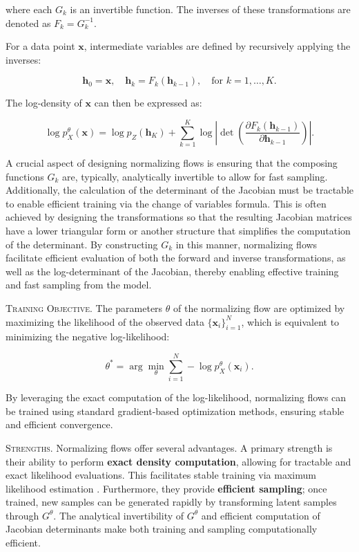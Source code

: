 \noindent where each $G_k$ is an invertible function. The inverses of these transformations are denoted as $F_k = G_k^{-1}$.

\noindent For a data point $\mathbf{x}$, intermediate variables are defined by recursively applying the inverses:

\[
\mathbf{h}_0 = \mathbf{x}, \quad \mathbf{h}_k = F_k(\mathbf{h}_{k-1}), \quad \text{for } k = 1, \dots, K.
\]

\noindent The log-density of $\mathbf{x}$ can then be expressed as:

\[
\log p^\theta_X(\mathbf{x}) = \log p_Z(\mathbf{h}_K) + \sum_{k=1}^{K} \log \left| \det \left( \frac{\partial F_k(\mathbf{h}_{k-1})}{\partial \mathbf{h}_{k-1}} \right) \right|.
\]

A crucial aspect of designing normalizing flows is ensuring that the composing functions \( G_k \) are, typically, analytically invertible to allow for fast sampling. Additionally, the calculation of the determinant of the Jacobian must be tractable to enable efficient training via the change of variables formula. This is often achieved by designing the transformations so that the resulting Jacobian matrices have a lower triangular form or another structure that simplifies the computation of the determinant. By constructing \( G_k \) in this manner, normalizing flows facilitate efficient evaluation of both the forward and inverse transformations, as well as the log-determinant of the Jacobian, thereby enabling effective training and fast sampling from the model.

\textsc{Training Objective.} The parameters $\theta$ of the normalizing flow are optimized by maximizing the likelihood of the observed data $\{\mathbf{x}_i\}_{i=1}^N$, which is equivalent to minimizing the negative log-likelihood:

\[
\theta^* = \arg \min_{\theta} \sum_{i=1}^N -\log p^\theta_X(\mathbf{x}_i).
\]

By leveraging the exact computation of the log-likelihood, normalizing flows can be trained using standard gradient-based optimization methods, ensuring stable and efficient convergence.

\textsc{Strengths.} Normalizing flows offer several advantages. A primary strength is their ability to perform \textbf{exact density computation}, allowing for tractable and exact likelihood evaluations. This facilitates stable training via maximum likelihood estimation \cite{papamakarios2019normalizing}. Furthermore, they provide \textbf{efficient sampling}; once trained, new samples can be generated rapidly by transforming latent samples through \( G^\theta \). The analytical invertibility of \( G^\theta \) and efficient computation of Jacobian determinants make both training and sampling computationally efficient.

